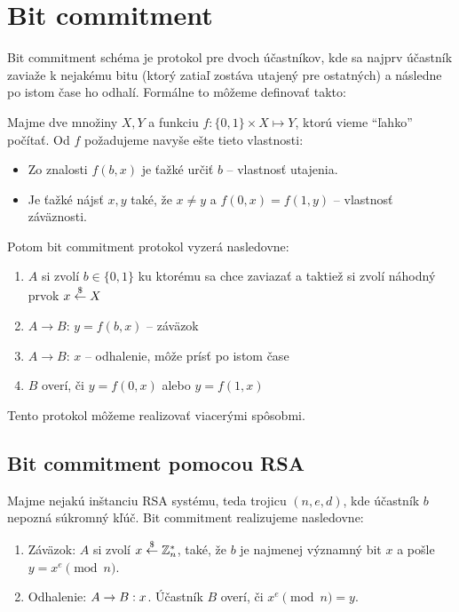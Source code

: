\section{Bit commitment}

Bit commitment schéma je protokol pre dvoch účastníkov, kde sa najprv účastník
zaviaže k nejakému bitu (ktorý zatiaľ zostáva utajený pre ostatných) 
a následne po istom čase ho odhalí. Formálne to môžeme definovať takto:

\begin{definicia}
    Majme dve množiny $X,Y$ a funkciu $f\colon \{0,1\} \times X \mapsto Y$,
    ktorú vieme ``ľahko'' počítať.
    Od $f$ požadujeme navyše ešte tieto vlastnosti:
    \begin{itemize}
    \item Zo znalosti $f(b,x)$ je ťažké určiť $b$ -- vlastnosť utajenia.

    \item Je ťažké nájsť $x, y$ také, že $x \neq y$ a 
            $f(0,x) = f(1,y)$ -- vlastnosť záväznosti.
    \end{itemize}

    Potom bit commitment protokol vyzerá nasledovne:

    \begin{enumerate}
    \item $A$ si zvolí $b \in \{0,1\}$ ku ktorému sa chce zaviazať a
            taktiež si zvolí náhodný prvok $x \overset{\$}{\leftarrow} X$
    \item $A \to B$: $y = f(b,x)$ -- záväzok
    \item $A \to B$: $x$ -- odhalenie, môže prísť po istom čase
    \item $B$ overí, či $y = f(0,x)$ alebo $y = f(1,x)$
    \end{enumerate}
\end{definicia}

Tento protokol môžeme realizovať viacerými spôsobmi. 

\subsection{Bit commitment pomocou RSA}

Majme nejakú inštanciu RSA systému, teda trojicu $(n,e,d)$,
kde účastník $b$ nepozná súkromný kľúč.
Bit commitment realizujeme nasledovne:
\begin{enumerate}
    \item Záväzok: $A$ si zvolí $x \overset{\$}{\leftarrow} \mathbb{Z}_n^*$, také, že
        $b$ je najmenej významný bit $x$ a pošle 
        $y = x^e \pmod n$.
    \item Odhalenie: $A \rightarrow B:x$. Účastník $B$ overí, či
        $x^e \pmod n = y$.
\end{enumerate}

